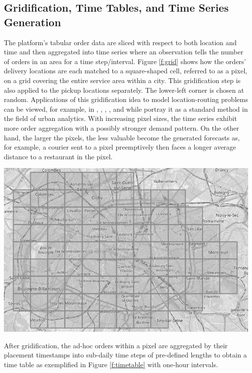 \subsection{Gridification, Time Tables, and Time Series Generation}
\label{grid}

The platform's tabular order data are sliced with respect to both location and
    time and then aggregated into time series where an observation tells
    the number of orders in an area for a time step/interval.
Figure \ref{f:grid} shows how the orders' delivery locations are each
    matched to a square-shaped cell, referred to as a pixel, on a grid
    covering the entire service area within a city.
This gridification step is also applied to the pickup locations separately.
The lower-left corner is chosen at random.
Applications of this gridification idea to model location-routing problems
    can be viewed, for example, in \cite{winkenbach2015}, \cite{bergmann2020},
    \cite{janjevic2019}, \cite{snoeck2020}, and \cite{janjevic2020}
    while \cite{singleton2017} portray it as a standard method in the field of
    urban analytics.
With increasing pixel sizes, the time series exhibit more order aggregation
    with a possibly stronger demand pattern.
On the other hand, the larger the pixels, the less valuable become the
    generated forecasts as, for example, a courier sent to a pixel
    preemptively then faces a longer average distance to a restaurant in the
    pixel.

\begin{center}
\label{f:grid}
\includegraphics[width=.8\linewidth]{static/gridification_for_paris_gray.png}
\end{center}

After gridification, the ad-hoc orders within a pixel are aggregated by their
    placement timestamps into sub-daily time steps of pre-defined lengths
    to obtain a time table as exemplified in Figure \ref{f:timetable} with
    one-hour intervals.

